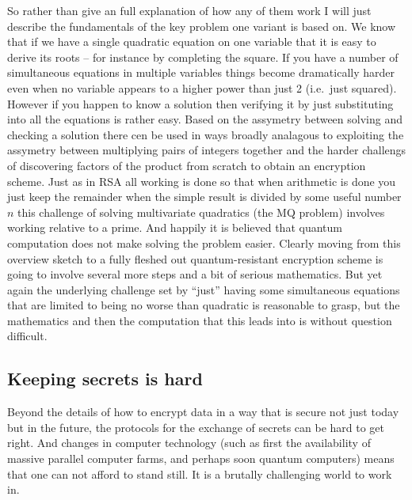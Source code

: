 So rather than give an full explanation of how any of them work I will just
describe the fundamentals of the key problem one variant is based on.
We know that if we have a single quadratic equation on one variable that it
is easy to derive its roots -- for instance by completing the square. If you
have a number of simultaneous equations in multiple variables things become
dramatically harder even when no variable appears to a higher power than just 2
(i.e.\ just squared). However if you happen to know a solution then verifying it
by just substituting into all the equations is rather easy. Based on the
assymetry between solving and checking a solution there cen be used in ways
broadly analagous to exploiting the assymetry between multiplying pairs of
integers together and the harder challengs of discovering factors of the
product from scratch to obtain an encryption scheme. Just as in RSA all working
is done so that when arithmetic is done you just keep the remainder when the
simple result is divided by some useful number $n$ this challenge of solving
multivariate quadratics (the MQ problem) involves working relative to a prime.
And happily it is believed that quantum computation does not make solving the
problem easier. Clearly moving from this overview sketch to a fully fleshed out
quantum-resistant encryption scheme is going to involve several more steps and
a bit of serious mathematics. But yet again the underlying challenge set by ``just''
having some simultaneous equations that are limited to being no worse than
quadratic is reasonable to grasp, but the mathematics and then the computation
that this leads into is without question difficult.

\subsection{Keeping secrets is hard}
Beyond the details of how to encrypt data in a way that is secure not just
today but in the future, the protocols for the exchange of secrets can
be hard to get right. And changes in computer technology (such as first the
availability of massive parallel computer farms, and perhaps soon
quantum computers) means that one can not afford to stand still. It is
a brutally challenging world to work in. 
